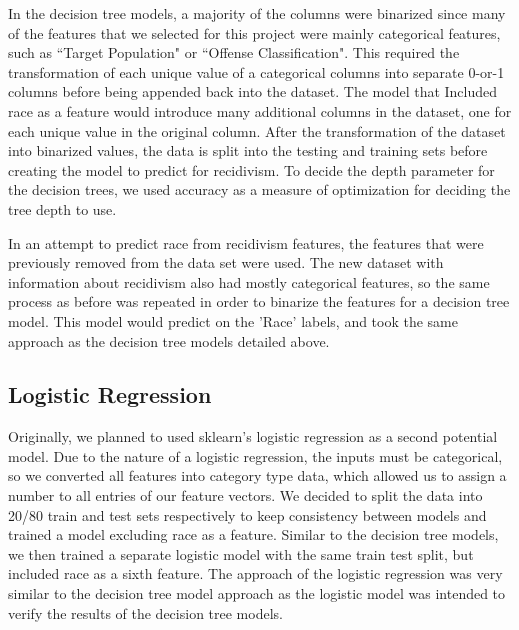 \documentclass[11pt, sigconf]{acmart}
\begin{document}
In the decision tree models, a majority of the columns were binarized since many of the features that we selected for this project were mainly categorical features, such as ``Target Population" or ``Offense Classification". This required the transformation of each unique value of a categorical columns into separate 0-or-1 columns before being appended back into the dataset. The model that Included race as a feature would introduce many additional columns in the dataset, one for each unique value in the original column. After the transformation of the dataset into binarized values, the data is split into the testing and training sets before creating the model to predict for recidivism. To decide the depth parameter for the decision trees, we used accuracy as a measure of optimization for deciding the tree depth to use. 

In an attempt to predict race from recidivism features, the features that were previously removed from the data set were used. The new dataset with information about recidivism also had mostly categorical features, so the same process as before was repeated in order to binarize the features for a decision tree model. This model would predict on the 'Race' labels, and took the same approach as the decision tree models detailed above. 

\subsection{Logistic Regression}
\hspace{5mm}Originally, we planned to used sklearn's logistic regression as a second potential model. Due to the nature of a logistic regression, the inputs must be categorical, so we converted all features into category type data, which allowed us to assign a number to all entries of our feature vectors. We decided to split the data into 20/80 train and test sets respectively to keep consistency between models and trained a model excluding race as a feature. Similar to the decision tree models, we then trained a separate logistic model with the same train test split, but included race as a sixth feature. The approach of the logistic regression was very similar to the decision tree model approach as the logistic model was intended to verify the results of the decision tree models.
\end{document}
